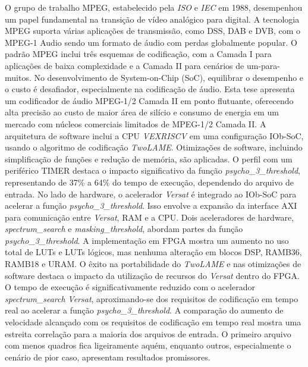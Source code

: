 O grupo de trabalho MPEG, estabelecido pela \textit{ISO} e \textit{IEC} em 1988, desempenhou um papel fundamental na transição de vídeo analógico para digital. A tecnologia MPEG suporta várias aplicações de transmissão, como DSS, DAB e DVB, com o MPEG-1 Audio sendo um formato de áudio com perdas globalmente popular. O padrão MPEG inclui três esquemas de codificação, com a Camada I para aplicações de baixa complexidade e a Camada II para cenários de um-para-muitos.
No desenvolvimento de System-on-Chip (SoC), equilibrar o desempenho e o custo é desafiador, especialmente na codificação de áudio. Esta tese apresenta um codificador de áudio MPEG-1/2 Camada II em ponto flutuante, oferecendo alta precisão ao custo de maior área de silício e consumo de energia em um mercado com núcleos comerciais limitados de MPEG-1/2 Camada II.
A arquitetura de software inclui a CPU \textit{VEXRISCV} em uma configuração IOb-SoC, usando o algoritmo de codificação \textit{TwoLAME}. Otimizações de software, incluindo simplificação de funções e redução de memória, são aplicadas. O perfil com um periférico TIMER destaca o impacto significativo da função \textit{psycho\_3\_threshold}, representando de 37\% a 64\% do tempo de execução, dependendo do arquivo de entrada.
No lado de hardware, o acelerador \textit{Versat} é integrado ao IOb-SoC para acelerar a função \textit{psycho\_3\_threshold}. Isso envolve a expansão da interface AXI para comunicação entre \textit{Versat}, RAM e a CPU. Dois aceleradores de hardware, \textit{spectrum\_search} e \textit{masking\_threshold}, abordam partes da função \textit{psycho\_3\_threshold}. A implementação em FPGA mostra um aumento no uso total de LUTs e LUTs lógicos, mas nenhuma alteração em blocos DSP, RAMB36, RAMB18 e URAM.
O êxito na portabilidade do \textit{TwoLAME} e nas otimizações de software destaca o impacto da utilização de recursos do \textit{Versat} dentro do FPGA. O tempo de execução é significativamente reduzido com o acelerador \textit{spectrum\_search} \textit{Versat}, aproximando-se dos requisitos de codificação em tempo real ao acelerar a função \textit{psycho\_3\_threshold}.
A comparação do aumento de velocidade alcançado com os requisitos de codificação em tempo real mostra uma estreita correlação para a maioria dos arquivos de entrada. O primeiro arquivo com menos quadros fica ligeiramente aquém, enquanto outros, especialmente o cenário de pior caso, apresentam resultados promissores.